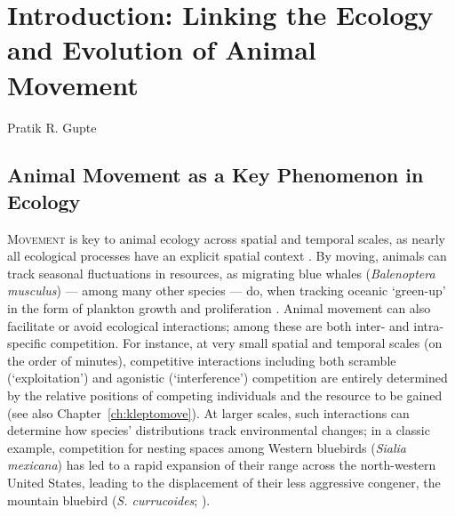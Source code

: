 
{}%
\chapter{Introduction: Linking the Ecology and Evolution of Animal Movement}\label{ch:introduction}

{{Pratik R. Gupte}}

\medskip


\section*{Animal Movement as a Key Phenomenon in Ecology}

\lettrine{M}{ovement} is key to animal ecology across spatial and temporal scales, as nearly all ecological processes have an explicit spatial context \citep{nathan2008a}.
By moving, animals can track seasonal fluctuations in resources, as migrating blue whales (\emph{Balenoptera musculus}) --- among many other species --- do, when tracking oceanic `green-up' in the form of plankton growth and proliferation \parencite{abrahms2021a,abrahms2019}.
Animal movement can also facilitate or avoid ecological interactions; among these are both inter- and intra-specific competition.
For instance, at very small spatial and temporal scales (on the order of minutes), competitive interactions including both scramble (`exploitation') and agonistic (`interference') competition \parencite[][]{keddy2001,birch1957} are entirely determined by the relative positions of competing individuals and the resource to be gained (see also Chapter~\ref{ch:kleptomove}).
At larger scales, such interactions can determine how species' distributions track environmental changes; in a classic example, competition for nesting spaces among Western bluebirds (\emph{Sialia mexicana}) has led to a rapid expansion of their range across the north-western United States, leading to the displacement of their less aggressive congener, the mountain bluebird (\emph{S. currucoides}; \cite{duckworth2007}).

